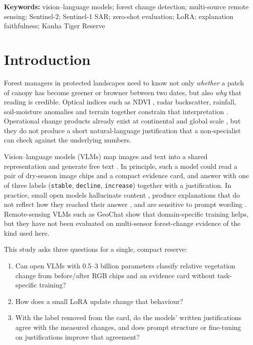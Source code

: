 \documentclass[11pt]{article}
\begin{document}
\noindent
\textbf{Keywords:} vision--language models; forest change detection;
multi-source remote sensing; Sentinel-2; Sentinel-1 SAR; zero-shot
evaluation; LoRA; explanation faithfulness; Kanha Tiger Reserve


\section{Introduction}

Forest managers in protected landscapes need to know not only
\emph{whether} a patch of canopy has become greener or browner between
two dates, but also \emph{why} that reading is credible. Optical indices
such as NDVI \citep{rouse1974,tucker1979}, radar backscatter, rainfall,
soil-moisture anomalies and terrain together constrain that
interpretation \citep{lillesand2015}. Operational change products
already exist at continental and global scale
\citep{hansen2013,kennedy2010,zhu2014}, but they do not produce a short
natural-language justification that a non-specialist can check against
the underlying numbers.

Vision--language models (VLMs) map images and text into a shared
representation and generate free text
\citep{liu2023llava,wang2024qwen2vl,beyer2024,li2023blip2}. In
principle, such a model could read a pair of dry-season image chips and
a compact evidence card, and answer with one of three labels
(\texttt{stable}, \texttt{decline}, \texttt{increase}) together with a
justification. In practice, small open models hallucinate content
\citep{li2023pope}, produce explanations that do not reflect how they
reached their answer \citep{turpin2023,jacovi2020}, and are sensitive to
prompt wording \citep{zhao2021calibrate}. Remote-sensing VLMs such as
GeoChat \citep{kuckreja2024} show that domain-specific training helps,
but they have not been evaluated on multi-sensor forest-change evidence
of the kind used here.

This study asks three questions for a single, compact reserve:
\begin{enumerate}
\item Can open VLMs with 0.5--3 billion parameters classify relative
vegetation change from before/after RGB chips and an evidence card
without task-specific training?
\item How does a small LoRA update \citep{hu2022lora} change that
behaviour?
\item With the label removed from the card, do the models' written
justifications agree with the measured changes, and does prompt
structure or fine-tuning on justifications improve that agreement?
\end{enumerate}
\end{document}
